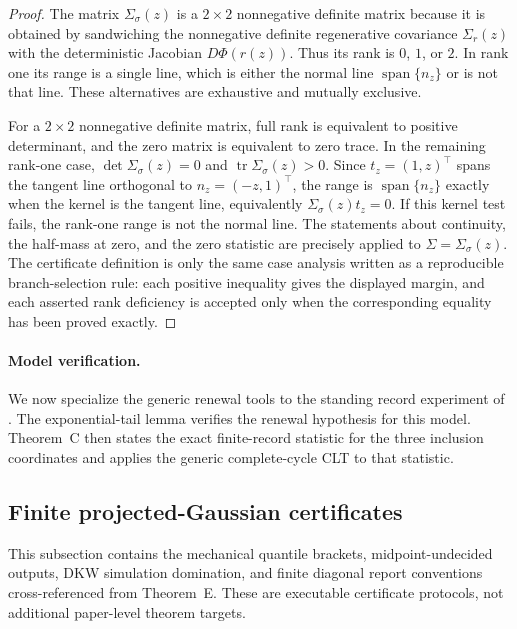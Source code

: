\begin{proof}
The matrix \(\Sigma_\sigma(z)\) is a \(2\times2\) nonnegative definite matrix
because it is obtained by sandwiching the nonnegative definite regenerative
covariance \(\Sigma_r(z)\) with the deterministic Jacobian \(D\Phi(r(z))\).
Thus its rank is \(0\), \(1\), or \(2\).  In rank one its range is a single
line, which is either the normal line \(\operatorname{span}\{n_z\}\) or is not
that line.  These alternatives are exhaustive and mutually exclusive.

For a \(2\times2\) nonnegative definite matrix, full rank is equivalent to
positive determinant, and the zero matrix is equivalent to zero trace.  In the
remaining rank-one case, \(\det\Sigma_\sigma(z)=0\) and
\(\operatorname{tr}\Sigma_\sigma(z)>0\).  Since
\(t_z=(1,z)^\top\) spans the tangent line orthogonal to \(n_z=(-z,1)^\top\),
the range is \(\operatorname{span}\{n_z\}\) exactly when the kernel is the
tangent line, equivalently \(\Sigma_\sigma(z)t_z=0\).  If this kernel test
fails, the rank-one range is not the normal line.  The statements about
continuity, the half-mass at zero, and the zero statistic are precisely
 applied to
\(\Sigma=\Sigma_\sigma(z)\).  The certificate definition is only the same
case analysis written as a reproducible branch-selection rule: each positive
inequality gives the displayed margin, and each asserted rank deficiency is
accepted only when the corresponding equality has been proved exactly.
\end{proof}

\paragraph{Model verification.}
We now specialize the generic renewal tools to the standing record experiment
of .  The exponential-tail lemma
verifies the renewal hypothesis for this model.  Theorem~C then states the
exact finite-record statistic for the three inclusion coordinates and applies
the generic complete-cycle CLT to that statistic.


\subsection{Finite projected-Gaussian certificates}\label{app:finite-projected-gaussian-certificates-main}

This subsection contains the mechanical quantile brackets, midpoint-undecided
outputs, DKW simulation domination, and finite diagonal report conventions
cross-referenced from Theorem~E.  These are executable certificate protocols,
not additional paper-level theorem targets.

